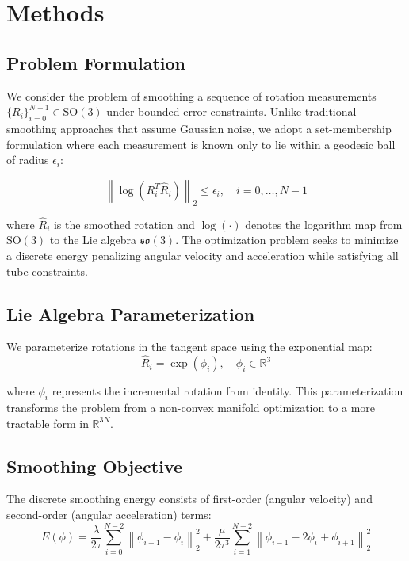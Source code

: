 \section{Methods}

\subsection{Problem Formulation}

We consider the problem of smoothing a sequence of rotation measurements $\{R_i\}_{i=0}^{N-1} \in \mathrm{SO}(3)$ under bounded-error constraints. Unlike traditional smoothing approaches that assume Gaussian noise, we adopt a set-membership formulation where each measurement is known only to lie within a geodesic ball of radius $\epsilon_i$:

\begin{equation}
\label{eq:tube_constraint}
\left\| \log(R_i^T \hat{R}_i) \right\|_2 \leq \epsilon_i, \quad i = 0, \ldots, N-1
\end{equation}

where $\hat{R}_i$ is the smoothed rotation and $\log(\cdot)$ denotes the logarithm map from $\mathrm{SO}(3)$ to the Lie algebra $\mathfrak{so}(3)$. The optimization problem seeks to minimize a discrete energy penalizing angular velocity and acceleration while satisfying all tube constraints.

\subsection{Lie Algebra Parameterization}

We parameterize rotations in the tangent space using the exponential map:
\begin{equation}
\label{eq:parameterization}
\hat{R}_i = \exp(\phi_i), \quad \phi_i \in \mathbb{R}^3
\end{equation}

where $\phi_i$ represents the incremental rotation from identity. This parameterization transforms the problem from a non-convex manifold optimization to a more tractable form in $\mathbb{R}^{3N}$.

\subsection{Smoothing Objective}

The discrete smoothing energy consists of first-order (angular velocity) and second-order (angular acceleration) terms:
\begin{equation}
\label{eq:objective}
E(\phi) = \frac{\lambda}{2\tau}\sum_{i=0}^{N-2} \left\| \phi_{i+1} - \phi_i \right\|_2^2 + \frac{\mu}{2\tau^3}\sum_{i=1}^{N-2} \left\| \phi_{i-1} - 2\phi_i + \phi_{i+1} \right\|_2^2
\end{equation}

